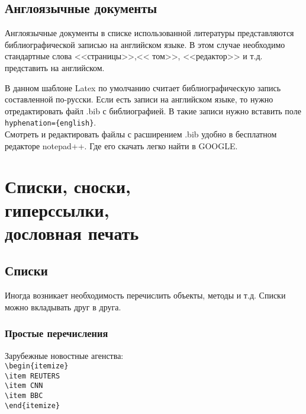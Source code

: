 \section{Англоязычные документы}

Англоязычные документы в списке использованной литературы представляются библиографической записью на английском языке. В этом случае необходимо стандартные слова <<страницы>>,<< том>>, <<редактор>> и т.д. представить на английском.

В данном шаблоне Latex по умолчанию считает библиографическую запись составленной по-русски. Если есть записи на английском языке, то нужно отредактировать файл .bib с библиографией. В такие записи нужно вставить поле \\
\verb|hyphenation={english}|. \\
Смотреть и редактировать файлы с расширением .bib удобно в бесплатном редакторе notepad++. Где его скачать легко найти в GOOGLE.

\chapter[Списки, сноски, дословная печать]{Списки, сноски, \\гиперссылки, \\дословная печать}

\section{Списки}

Иногда возникает необходимость перечислить объекты, методы и т.д. Списки можно вкладывать друг в друга.

\subsection{Простые перечисления}

Зарубежные новостные агенства:\\
\verb|\begin{itemize}|\\
\verb|\item REUTERS|\\
\verb|\item CNN|\\
\verb|\item BBC|\\
\verb|\end{itemize}|\\

